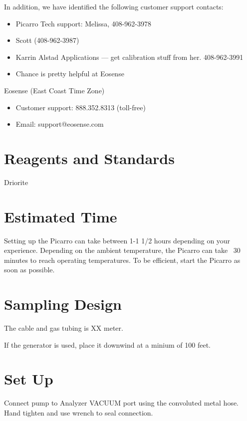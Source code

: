 \documentclass[12pt]{../SOP3}\usepackage[]{graphicx}\usepackage[]{color}
\begin{document}
\NP In addition, we have identified the following customer support contacts:

\begin{itemize}
  \item Picarro Tech support: Melissa, 408-962-3978
  \item Scott (408-962-3987)
  \item Karrin Alstad Applications --- get calibration stuff from her. 408-962-3991
  \item Chance is pretty helpful at Eosense
\end{itemize}

\NP Eosense (East Coast Time Zone)

\begin{itemize}
  \item Customer support: 888.352.8313 (toll-free)
  \item Email: support@eosense.com
\end{itemize}

\section{Reagents and Standards}


\NP Driorite


\section{Estimated Time}

\NP Setting up the Picarro can take between 1-1 1/2 hours depending on your experience. Depending on the ambient temperature, the Picarro can take ~30 minutes to reach operating temperatures. To be efficient, start the Picarro as soon as possible.

\section{Sampling Design}

\NP The cable and gas tubing is XX meter.

\NP If the generator is used, place it downwind at a minium of 100 feet.

\section{Set Up}

\NP Connect pump to Analyzer VACUUM port using the convoluted metal hose. Hand tighten and use wrench to seal connection.
\end{document}
